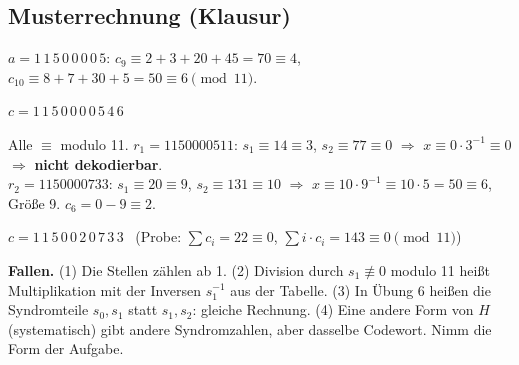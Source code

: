 \subsection*{Musterrechnung (Klausur)}
$a = 1\,1\,5\,0\,0\,0\,0\,5$: $c_9 \equiv 2 + 3 + 20 + 45 = 70 \equiv 4$, \ $c_{10} \equiv 8 + 7 + 30 + 5 = 50 \equiv 6 \pmod{11}$.
\begin{ergebnis} $c = 1\,1\,5\,0\,0\,0\,0\,5\,4\,6$ \end{ergebnis}
Alle $\equiv$ modulo 11. $r_1 = 1150000511$: $s_1 \equiv 14 \equiv 3$, $s_2 \equiv 77 \equiv 0$ $\Rightarrow$ $x \equiv 0 \cdot 3^{-1} \equiv 0$ $\Rightarrow$ \textbf{nicht dekodierbar}.\\
$r_2 = 1150000733$: $s_1 \equiv 20 \equiv 9$, $s_2 \equiv 131 \equiv 10$ $\Rightarrow$ $x \equiv 10 \cdot 9^{-1} \equiv 10 \cdot 5 = 50 \equiv 6$, Größe 9.
$c_6 = 0 - 9 \equiv 2$.
\begin{ergebnis} $c = 1\,1\,5\,0\,0\,2\,0\,7\,3\,3$ \ (Probe: $\sum c_i = 22 \equiv 0$, $\sum i \cdot c_i = 143 \equiv 0 \pmod{11}$) \end{ergebnis}

\begin{achtung}
\textbf{Fallen.} (1) Die Stellen zählen ab 1. (2) Division durch $s_1 \not\equiv 0$ modulo 11 heißt Multiplikation mit der Inversen $s_1^{-1}$ aus der Tabelle.
(3) In Übung 6 heißen die Syndromteile $s_0, s_1$ statt $s_1, s_2$: gleiche Rechnung.
(4) Eine andere Form von $H$ (systematisch) gibt andere Syndromzahlen, aber dasselbe Codewort. Nimm die Form der Aufgabe.
\end{achtung}
